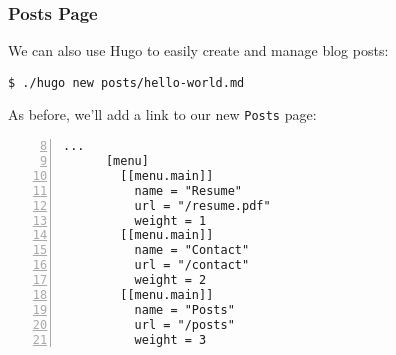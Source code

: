 \begin{frame}[fragile]
    \frametitle{Posts Page}

    We can also use Hugo to easily create and manage blog posts:

    \medskip

    \begin{lstlisting}[style=saneCode,gobble=8]
        $ ./hugo new posts/hello-world.md
    \end{lstlisting}

    \vfill
    As before, we'll add a link to our new \texttt{Posts} page:

    \begin{lstlisting}[style=saneCode,gobble=6,title={config.toml},numbers=left,firstnumber=8]
      ...
      [menu]
        [[menu.main]]
          name = "Resume"
          url = "/resume.pdf"
          weight = 1
        [[menu.main]]
          name = "Contact"
          url = "/contact"
          weight = 2
        [[menu.main]]
          name = "Posts"
          url = "/posts"
          weight = 3
    \end{lstlisting}
\end{frame}